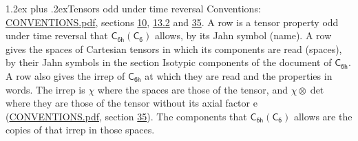 \documentclass[10pt,a4paper]{article}
\makeatletter
\renewcommand\section{\@startsection{section}{1}{\z@}{-3ex plus -1ex minus -.2ex}%
  {1.2ex plus .2ex}{\normalfont\large\sffamily\bfseries\color{parttitle}}}
\numberwithin{equation}{section}
\newcommand{\grp}[1]{\mathsf{#1}}
\newcommand{\irrprod}{\otimes}
\makeatother
\begin{document}
\section{Tensors odd under time reversal}\label{s:time_odd}
Conventions: \href{../../CONVENTIONS.pdf}{CONVENTIONS.pdf}, sections \href{../../../rotation/CONVENTIONS.pdf\#conv.10}{10}, \href{../../../rotation/CONVENTIONS.pdf\#conv.13.2}{13.2} and \href{../../CONVENTIONS.pdf\#conv.35}{35}.
\leavevmode\label{n:head.name.property}A row is a tensor property odd under time reversal that $\grp{C_{6h}}(\grp{C_{6}})$ allows, by its Jahn symbol (name). \label{n:head.spaces}A row gives the spaces of Cartesian tensors in which its components are read (spaces), by their Jahn symbols in the section Isotypic components of the document of \href{../../../rotation/data/pdf/C6h.pdf}{$\grp{C_{6h}}$}. \label{n:head.properties}A row also gives the irrep of $\grp{C_{6h}}$ at which they are read and the properties in words. The irrep is $\chi$ where the spaces are those of the tensor, and $\chi \irrprod \det$ where they are those of the tensor without its axial factor e (\href{../../CONVENTIONS.pdf}{CONVENTIONS.pdf}, section \href{../../CONVENTIONS.pdf\#conv.35}{35}). The components that $\grp{C_{6h}}(\grp{C_{6}})$ allows are the copies of that irrep in those spaces.
\end{document}
